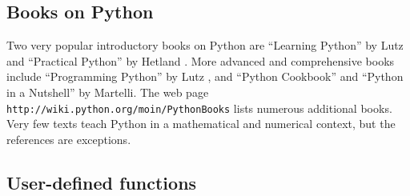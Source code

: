 \subsection{Books on Python}
\label{langtangen:appendix:pybooks}

Two very popular introductory books on Python are
``Learning Python''  by Lutz \cite{Lutz2007} and
``Practical Python''  by Hetland \cite{Hetland2002}.
More advanced and comprehensive books include
``Programming Python'' by Lutz \cite{Lutz2006},
and ``Python Cookbook'' \cite{MartelliAscher2005} and ``Python in a Nutshell''
\cite{Martelli2006} by Martelli.
The web page {\fontsize{10pt}{10pt}\texttt{http://wiki.python.org/moin/PythonBooks}} 
lists numerous additional books.
Very few texts teach Python in a mathematical and numerical context,
but the references \cite{Langtangen2008,Langtangen2009a,Kiusalaas2005} 
are exceptions.



\subsection{User-defined functions}
\label{langtangen:app:cpp:functions}


